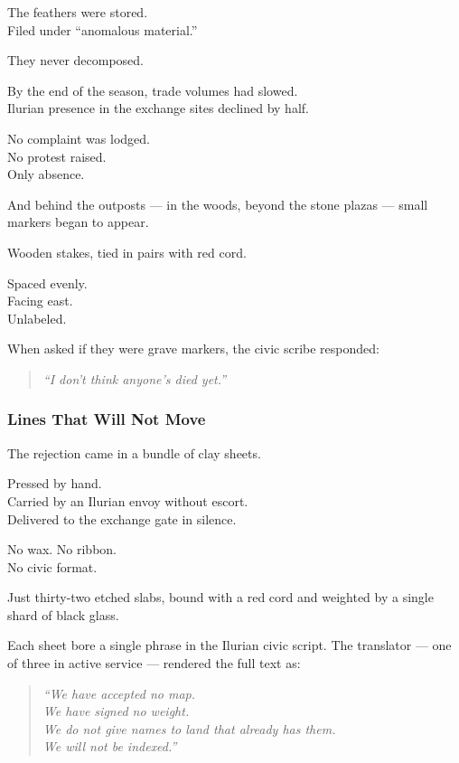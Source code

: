 \documentclass[12pt]{article}
\begin{document}
The feathers were stored.\\
Filed under ``anomalous material.”

They never decomposed.

\vspace{1em}

By the end of the season, trade volumes had slowed.\\
Ilurian presence in the exchange sites declined by half.

No complaint was lodged.\\
No protest raised.\\
Only absence.

And behind the outposts — in the woods, beyond the stone plazas — small markers began to appear.

Wooden stakes, tied in pairs with red cord.

Spaced evenly.\\
Facing east.\\
Unlabeled.

When asked if they were grave markers, the civic scribe responded:

\begin{quote}
\textit{“I don’t think anyone’s died yet.”}
\end{quote}

\dotfill

\subsubsection{Lines That Will Not Move}

The rejection came in a bundle of clay sheets.

Pressed by hand.\\
Carried by an Ilurian envoy without escort.\\
Delivered to the exchange gate in silence.

No wax. No ribbon.\\
No civic format.

Just thirty-two etched slabs, bound with a red cord and weighted by a single shard of black glass.

Each sheet bore a single phrase in the Ilurian civic script. The translator --- one of three in active service --- rendered the full text as:

\begin{quote}
\textit{“We have accepted no map.}\\
\textit{We have signed no weight.}\\
\textit{We do not give names to land that already has them.}\\
\textit{We will not be indexed.”}
\end{quote}
\end{document}
